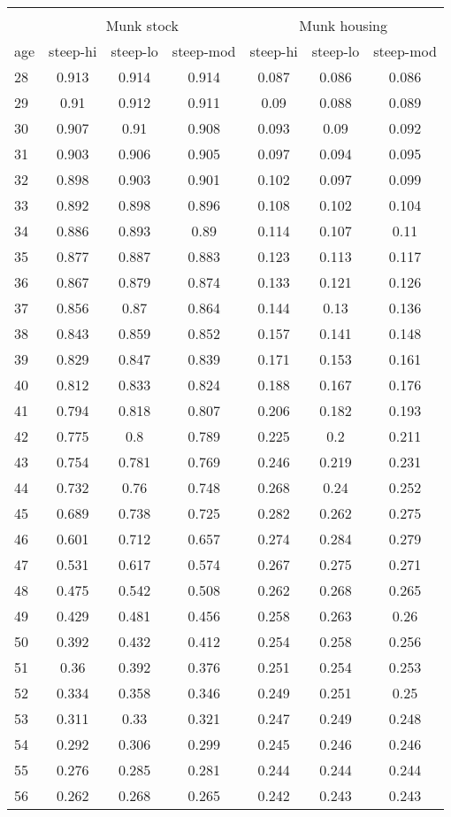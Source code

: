 \begin{longtable}{|l|ccc|ccc|}
		\hline
\multicolumn{7}{c}{}\\
		&\multicolumn{3}{c|}{Munk stock}&\multicolumn{3}{c|}{Munk housing}\\
		\hline
		age&steep-hi&steep-lo&steep-mod&steep-hi&steep-lo&steep-mod\\
		\hline
28&0.913&0.914&0.914&0.087&0.086&0.086\\
29&0.91&0.912&0.911&0.09&0.088&0.089\\
30&0.907&0.91&0.908&0.093&0.09&0.092\\
31&0.903&0.906&0.905&0.097&0.094&0.095\\
32&0.898&0.903&0.901&0.102&0.097&0.099\\
33&0.892&0.898&0.896&0.108&0.102&0.104\\
34&0.886&0.893&0.89&0.114&0.107&0.11\\
35&0.877&0.887&0.883&0.123&0.113&0.117\\
36&0.867&0.879&0.874&0.133&0.121&0.126\\
37&0.856&0.87&0.864&0.144&0.13&0.136\\
38&0.843&0.859&0.852&0.157&0.141&0.148\\
39&0.829&0.847&0.839&0.171&0.153&0.161\\
40&0.812&0.833&0.824&0.188&0.167&0.176\\
41&0.794&0.818&0.807&0.206&0.182&0.193\\
42&0.775&0.8&0.789&0.225&0.2&0.211\\
43&0.754&0.781&0.769&0.246&0.219&0.231\\
44&0.732&0.76&0.748&0.268&0.24&0.252\\
45&0.689&0.738&0.725&0.282&0.262&0.275\\
46&0.601&0.712&0.657&0.274&0.284&0.279\\
47&0.531&0.617&0.574&0.267&0.275&0.271\\
48&0.475&0.542&0.508&0.262&0.268&0.265\\
49&0.429&0.481&0.456&0.258&0.263&0.26\\
50&0.392&0.432&0.412&0.254&0.258&0.256\\
51&0.36&0.392&0.376&0.251&0.254&0.253\\
52&0.334&0.358&0.346&0.249&0.251&0.25\\
53&0.311&0.33&0.321&0.247&0.249&0.248\\
54&0.292&0.306&0.299&0.245&0.246&0.246\\
55&0.276&0.285&0.281&0.244&0.244&0.244\\
56&0.262&0.268&0.265&0.242&0.243&0.243\\
		\hline
	\end{longtable}

